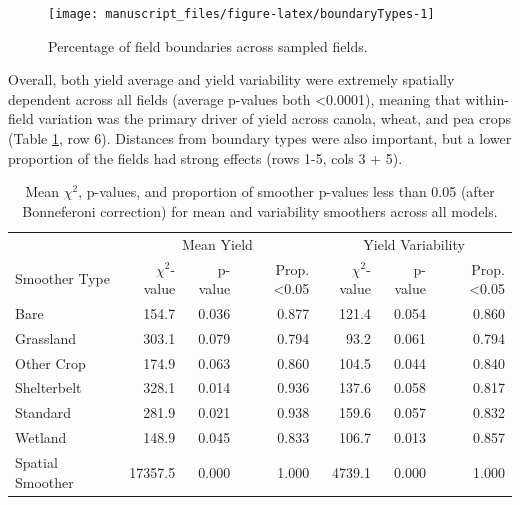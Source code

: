 \documentclass[]{elsarticle} %
\begin{document}
\begin{figure}
\texttt{[image: manuscript\_files/figure-latex/boundaryTypes-1]} \caption{Percentage of field boundaries across sampled fields.}\label{fig:boundaryTypes}
\end{figure}

Overall, both yield average and yield variability were extremely spatially dependent across all fields (average p-values both \textless0.0001), meaning that within-field variation was the primary driver of yield across canola, wheat, and pea crops (Table \ref{tab:smoothSummary}, row 6).
Distances from boundary types were also important, but a lower proportion of the fields had strong effects (rows 1-5, cols 3 + 5).

\begin{table}

\caption{\label{tab:smoothSummary}Mean $\chi^2$, p-values, and proportion of smoother p-values less than 0.05 (after Bonneferoni correction) for mean and variability smoothers across all models.}
\centering
\begin{tabular}[t]{l|r|r|r|r|r|r}
\hline
\multicolumn{1}{c|}{} & \multicolumn{3}{c|}{Mean Yield} & \multicolumn{3}{c}{Yield Variability} \\
\cline{2-4} \cline{5-7}
Smoother Type & $\chi^2$-value & p-value & Prop. <0.05 & $\chi^2$-value & p-value & Prop. <0.05\\
\hline
Bare & 154.7 & 0.036 & 0.877 & 121.4 & 0.054 & 0.860\\
\hline
Grassland & 303.1 & 0.079 & 0.794 & 93.2 & 0.061 & 0.794\\
\hline
Other Crop & 174.9 & 0.063 & 0.860 & 104.5 & 0.044 & 0.840\\
\hline
Shelterbelt & 328.1 & 0.014 & 0.936 & 137.6 & 0.058 & 0.817\\
\hline
Standard & 281.9 & 0.021 & 0.938 & 159.6 & 0.057 & 0.832\\
\hline
Wetland & 148.9 & 0.045 & 0.833 & 106.7 & 0.013 & 0.857\\
\hline
Spatial Smoother & 17357.5 & 0.000 & 1.000 & 4739.1 & 0.000 & 1.000\\
\hline
\end{tabular}
\end{table}
\end{document}
